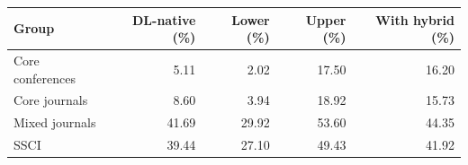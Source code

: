 \begin{tabular}{@{}lrrrr@{}}
\toprule
Group & DL-native (\%) & Lower (\%) & Upper (\%) & With hybrid (\%) \\
\midrule
Core conferences & 5.11 & 2.02 & 17.50 & 16.20 \\
Core journals & 8.60 & 3.94 & 18.92 & 15.73 \\
Mixed journals & 41.69 & 29.92 & 53.60 & 44.35 \\
SSCI & 39.44 & 27.10 & 49.43 & 41.92 \\
\bottomrule
\end{tabular}

